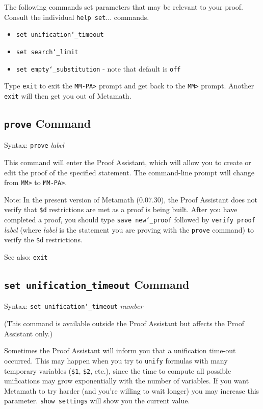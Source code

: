 The following commands set parameters that may be relevant to your proof.
Consult the individual \texttt{help set}... commands.
\begin{itemize}
   \item[] \texttt{set unification{\char`\_}timeout}
 \item[]
    \texttt{set search{\char`\_}limit}
  \item[]
    \texttt{set empty{\char`\_}substitution} - note that default is \texttt{off}
\end{itemize}

Type \texttt{exit} to exit the \texttt{MM-PA>}
 prompt and get back to the \texttt{MM>} prompt.
Another \texttt{exit} will then get you out of Metamath.



\subsection{\texttt{prove} Command}
Syntax:  \texttt{prove} {\em label}

This command will enter the Proof Assistant, which will
allow you to create or edit the proof of the specified statement.
The command-line prompt will change from \texttt{MM>} to \texttt{MM-PA>}.

Note:  In the present version of Metamath
(0.07.30), the Proof
Assistant does not verify that \texttt{\$d} restrictions are met as a proof is being built.  After you
have completed a proof, you should type \texttt{save new{\char`\_}proof}
followed by \texttt{verify proof} {\em label} (where {\em label} is the
statement you are proving with the \texttt{prove} command) to verify the
\texttt{\$d} restrictions.

See also: \texttt{exit}

\subsection{\texttt{set unification\_timeout} Command}
Syntax:  \texttt{set unification{\char`\_}timeout} {\em number}

(This command is available outside the Proof Assistant but affects the
Proof Assistant only.)

Sometimes the Proof Assistant will inform you that a unification
time-out occurred.  This may happen when you try to \texttt{unify}
formulas with many temporary variables
(\texttt{\$1}, \texttt{\$2}, etc.), since the time to compute all possible
unifications may grow exponentially with the number of variables.  If
you want Metamath to try harder (and you're willing to wait longer) you
may increase this parameter.  \texttt{show settings} will show you the
current value.



